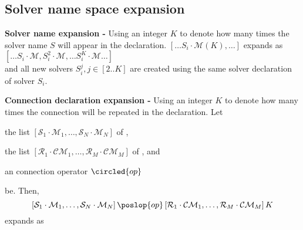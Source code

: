 %

\subsection{Solver name space expansion}


\textbf{Solver name expansion - } Using an integer $K$ to denote how many times the solver name $S$ will appear in the declaration. $\left[\dots S_i\cdot\mathcal{M}(K),\dots\right]$ expands as $\left[\dots S_i\cdot\mathcal{M}, S_i^2\cdot\mathcal{M},\dots S_i^K\cdot\mathcal{M}\dots\right]$\\
and all new solvers $S_i^j, j\in [2..K]$ are created using the same solver declaration of solver $S_i$.

\textbf{Connection declaration expansion - } Using an integer $K$ to denote how many times the connection will be repeated in the declaration. Let 
\begin{inparaenum}[a)]
\item the list $\left[\mathcal{S}_1\cdot\mathcal{M}_1,\dots,\mathcal{S}_{N}\cdot\mathcal{M}_{N}\right]$ of \jacks,
\item the list $\left[\mathcal{R}_1\cdot\mathcal{CM}_1,\dots,\mathcal{R}_{M}\cdot\mathcal{CM}_{M}\right]$ of \outlets{}, and
\item an connection operator $\circled{op}$
\end{inparaenum} be. Then, $$\left[\mathcal{S}_1\cdot\mathcal{M}_1,\dots,\mathcal{S}_{N}\cdot\mathcal{M}_{N}\right] \poslop{op} \left[\mathcal{R}_1\cdot\mathcal{CM}_1,\dots,\mathcal{R}_{M}\cdot\mathcal{CM}_{M}\right]K$$ expands as

